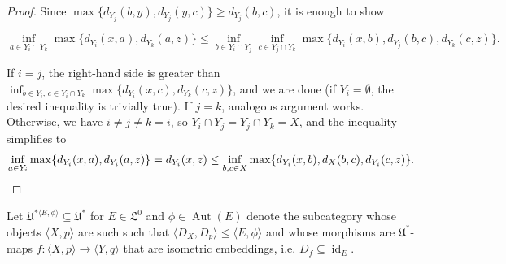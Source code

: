 \documentclass[10pt,a4paper]{article}
\theoremstyle{definition}
\theoremstyle{remark}
\newcommand \seq [1]{\langle #1 \rangle}
\newcommand \maps {\colon} %
\newcommand \id [1]{{\operatorname{id}_{#1}}}
\newcommand \Lin {\mathfrak{L}}
\newcommand \Ult {\mathfrak{U}}
\newcommand \Aut {\operatorname{Aut}}
\let \aut \Aut
\begin{document}
\begin{proof}
    Since $\max\{d_{Y_j}(b, y) , d_{Y_j}(y, c)\} \geq d_{Y_j}(b, c)$, it is enough to show
    
     \[
        \inf_{a \in Y_i \cap Y_k} \max\{d_{Y_i}(x, a) , d_{Y_k}(a, z)\}
        \leq
        \inf_{b \in Y_i \cap Y_j} \inf_{c \in Y_j \cap Y_k} \max\{d_{Y_i}(x, b) , d_{Y_j}(b, c) , d_{Y_k}(c, z)\}.
    \]
    
    If $i = j$, the right-hand side is greater than $\inf_{b \in Y_i,\, c \in Y_i \cap Y_k} \max\{d_{Y_i}(x, c) , d_{Y_k}(c, z)\}$, and we are done (if $Y_i = \emptyset$, the desired inequality is trivially true).
    If $j = k$, analogous argument works.
    Otherwise, we have $i \neq j \neq k = i$, so $Y_i \cap Y_j = Y_j \cap Y_k = X$, and the inequality simplifies to
     \[
        \inf_{a \in Y_i} \max\{d_{Y_i}(x, a) , d_{Y_i}(a, z)\}
        = d_{Y_i}(x, z) \leq
        \inf_{b, c \in X} \max\{d_{Y_i}(x, b) , d_{X}(b, c) , d_{Y_i}(c, z)\}.
        \qedhere
    \]
\end{proof}

Let $\Ult^{*\seq{E, \phi}} \subseteq \Ult^*$ for $E \in \Lin^0$ and $\phi \in \aut(E)$ denote the subcategory whose objects $\seq{X, p}$ are such such that $\seq{D_X, D_p} \leq \seq{E, \phi}$ and whose morphisms are $\Ult^*$-maps $f\maps \seq{X, p} \to \seq{Y, q}$ that are isometric embeddings, i.e. $D_f \subseteq \id{E}$.
\end{document}
